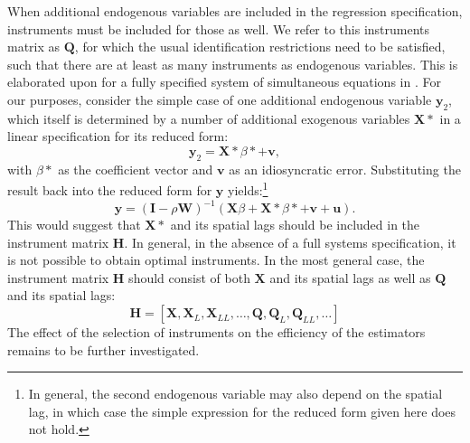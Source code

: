 \documentclass{article}
\begin{document}
When additional endogenous variables are included in the regression specification,
instruments must be included for those as well. We refer to this instruments
matrix as $\mathbf{Q}$, for which the usual identification restrictions need to be
satisfied, such that there are at least as many instruments as endogenous
variables. 
This is elaborated upon for a fully specified system of simultaneous equations
in \cite{KelejianPrucha:04}. For our purposes, 
consider the simple case of one additional endogenous variable $\mathbf{y}_2$,
which itself is determined by a number of additional exogenous variables $\mathbf{X*}$ in
a linear specification for its reduced form:
\begin{equation*}
 \mathbf{y}_2 = \mathbf{X*} \beta* + \mathbf{v},
\end{equation*}
with $\beta*$ as the coefficient vector and $\mathbf{v}$ as an idiosyncratic error.
Substituting the result back into the reduced form for $\mathbf{y}$ yields:\footnote{In 
general, the second endogenous variable may also depend on the spatial lag, in
which case the simple expression for the reduced form given here does
not hold.}
\begin{equation*}
 \mathbf{y} = (\mathbf{I} - \rho \mathbf{W} )^{-1} (\mathbf{X}\beta + \mathbf{X*} \beta* + \mathbf{v} + \mathbf{u}).
\end{equation*}
This would suggest that $\mathbf{X*}$ and its spatial lags should be included
in the instrument matrix $\mathbf{H}$. In general, in the absence of a full systems
specification, it is not possible to obtain optimal instruments. In the most general
case, the instrument matrix $\mathbf{H}$ should consist of both $\mathbf{X}$ and
its spatial lags as well as $\mathbf{Q}$ and its spatial lags:
\begin{equation*}
 \mathbf{H} = [ \mathbf{X}, \mathbf{X}_L, \mathbf{X}_{LL}, \dots, \mathbf{Q}, \mathbf{Q}_L, \mathbf{Q}_{LL}, \dots ]
\end{equation*}
The effect of the selection of instruments on the efficiency of the estimators
remains to be further investigated.
\end{document}
